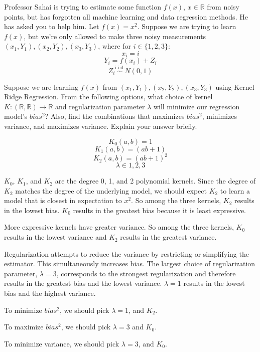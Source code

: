 Professor Sahai is trying to estimate some function $f(x)$, $x\in \mathbb{R}$ from noisy points, but has forgotten all machine learning and data regression methods. He has asked you to help him.
\newline\newline
Let $f(x) = x^2$. Suppose we are trying to learn $f(x)$, but we're only allowed to make three noisy measurements $(x_1, Y_1), (x_2, Y_2), (x_3, Y_3)$, where for $i \in \{1, 2, 3 \}$:
$$x_i = i$$
$$Y_i = f(x_i) + Z_i $$
$$Z_i \stackrel{\text{i.i.d.}}{\sim} N(0,1)$$

\begin{Parts}
\Part
Suppose we are learning $f(x)$ from $(x_1, Y_1), (x_2, Y_2), (x_3, Y_3)$ using Kernel Ridge Regression. From the following options, what choice of kernel $K: (\mathbb{R}, \mathbb{R}) \rightarrow \mathbb{R}$ and regularization parameter $\lambda$ will minimize our regression model's $bias^2$? Also, find the combinations that maximizes $bias^2$, minimizes variance, and maximizes variance. Explain your answer briefly.

$$K_0(a, b) = 1$$
$$K_1(a, b) = (ab + 1)$$
$$K_2(a, b) = (ab + 1)^2$$
$$\lambda \in {1, 2, 3}$$

\begin{solution}
  $K_0$, $K_1$, and $K_2$ are the degree 0, 1, and 2 polynomial kernels. Since the degree of $K_2$ matches the degree of the underlying model, we should expect $K_2$ to learn a model that is closest in expectation to $x^2$. So among the three kernels, $K_2$ results in the lowest bias. $K_0$ results in the greatest bias because it is least expressive.

More expressive kernels have greater variance. So among the three kernels, $K_0$ results in the lowest variance and $K_2$ results in the greatest variance.

Regularization attempts to reduce the variance by restricting or simplifying the estimator. This simultaneously increases bias. The largest choice of regularization parameter, $\lambda=3$, corresponds to the strongest regularization and therefore results in the greatest bias and the lowest variance. $\lambda=1$ results in the lowest bias and the highest variance.

To minimize $bias^2$, we should pick $\lambda=1$, and $K_2$.

To maximize $bias^2$, we should pick $\lambda=3$ and $K_0$.

To minimize variance, we should pick $\lambda=3$, and $K_0$.


\end{solution}
\end{Parts}
